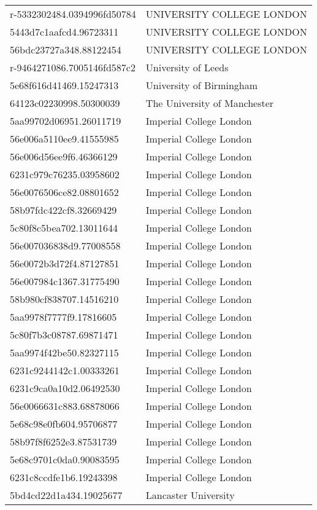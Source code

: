 \begin{tabular}{ll}
r-5332302484.0394996fd50784 & UNIVERSITY COLLEGE LONDON \\
5443d7c1aafcd4.96723311 & UNIVERSITY COLLEGE LONDON \\
56bdc23727a348.88122454 & UNIVERSITY COLLEGE LONDON \\
r-9464271086.7005146fd587c2 & University of Leeds \\
5e68f616d41469.15247313 & University of Birmingham \\
64123c02230998.50300039 & The University of Manchester \\
5aa99702d06951.26011719 & Imperial College London \\
56e006a5110ee9.41555985 & Imperial College London \\
56e006d56ee9f6.46366129 & Imperial College London \\
6231c979c76235.03958602 & Imperial College London \\
56e0076506ce82.08801652 & Imperial College London \\
58b97fdc422cf8.32669429 & Imperial College London \\
5c80f8c5bea702.13011644 & Imperial College London \\
56e007036838d9.77008558 & Imperial College London \\
56e0072b3d72f4.87127851 & Imperial College London \\
56e007984c1367.31775490 & Imperial College London \\
58b980cf838707.14516210 & Imperial College London \\
5aa9978f7777f9.17816605 & Imperial College London \\
5c80f7b3c08787.69871471 & Imperial College London \\
5aa9974f42be50.82327115 & Imperial College London \\
6231c9244142c1.00333261 & Imperial College London \\
6231c9ca0a10d2.06492530 & Imperial College London \\
56e0066631c883.68878066 & Imperial College London \\
5e68c98e0fb604.95706877 & Imperial College London \\
58b97f8f6252e3.87531739 & Imperial College London \\
5e68c9701c0da0.90083595 & Imperial College London \\
6231c8ccdfe1b6.19243398 & Imperial College London \\
5bd4cd22d1a434.19025677 & Lancaster University \\

\end{tabular}
